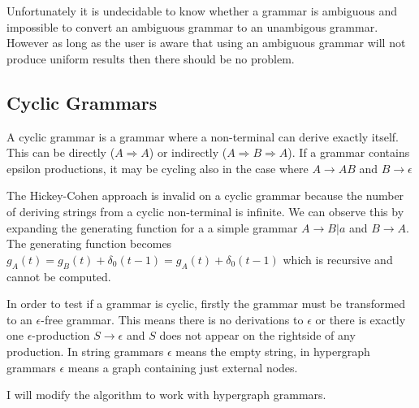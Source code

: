 
Unfortunately it is undecidable to know whether a grammar is ambiguous and impossible to convert an ambiguous grammar to an unambigous grammar. However as long as the user is aware that using an ambiguous grammar will not produce uniform results then there should be no problem.

\subsection{Cyclic Grammars}

A cyclic grammar is a grammar where a non-terminal can derive exactly itself. This can be directly ($A \Rightarrow A$) or indirectly ($A \Rightarrow B \Rightarrow A$). If a grammar contains epsilon productions, it may be cycling also in the case where $A \to AB$ and $B \to \epsilon$

The Hickey-Cohen approach is invalid on a cyclic grammar because the number of deriving strings from a cyclic non-terminal is infinite. We can observe this by expanding the generating function for a a simple grammar $A \to B | a$ and $B \to A$. The generating function becomes $g_A(t) = g_B(t) + \delta_0(t-1) = g_A(t) + \delta_0(t-1)$ which is recursive and cannot be computed.

In order to test if a grammar is cyclic, firstly the grammar must be transformed to an $\epsilon$-free grammar. This means there is no derivations to $\epsilon$ or there is exactly one $\epsilon$-production $S \to \epsilon$ and $S$ does not appear on the rightside of any production. In string grammars $\epsilon$ means the empty string, in hypergraph grammars $\epsilon$ means a graph containing just external nodes.

I will modify the algorithm to work with hypergraph grammars.

